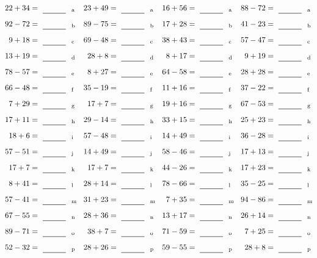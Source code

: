 \documentclass
[
  draft    = true,
  fontsize = 11pt,
  parskip  = half-
]
{scrartcl}
\begin{document}
\clearpage
\begin{align*}
    \pline{22+34}&=\rline{a}
  & \pline{23+49}&=\rline{a}
  & \pline{16+56}&=\rline{a}
  & \pline{88-72}&=\rline{a} \\[1ex]
    \pline{92-72}&=\rline{b}
  & \pline{89-75}&=\rline{b}
  & \pline{17+28}&=\rline{b}
  & \pline{41-23}&=\rline{b} \\[1ex]
    \pline{9+18}&=\rline{c}
  & \pline{69-48}&=\rline{c}
  & \pline{38+43}&=\rline{c}
  & \pline{57-47}&=\rline{c} \\[1ex]
    \pline{13+19}&=\rline{d}
  & \pline{28+8}&=\rline{d}
  & \pline{8+17}&=\rline{d}
  & \pline{9+19}&=\rline{d} \\[1ex]
    \pline{78-57}&=\rline{e}
  & \pline{8+27}&=\rline{e}
  & \pline{64-58}&=\rline{e}
  & \pline{28+28}&=\rline{e} \\[1ex]
    \pline{66-48}&=\rline{f}
  & \pline{35-19}&=\rline{f}
  & \pline{11+16}&=\rline{f}
  & \pline{37-22}&=\rline{f} \\[1ex]
    \pline{7+29}&=\rline{g}
  & \pline{17+7}&=\rline{g}
  & \pline{19+16}&=\rline{g}
  & \pline{67-53}&=\rline{g} \\[1ex]
    \pline{17+11}&=\rline{h}
  & \pline{29-14}&=\rline{h}
  & \pline{33+15}&=\rline{h}
  & \pline{25+23}&=\rline{h} \\[1ex]
    \pline{18+6}&=\rline{i}
  & \pline{57-48}&=\rline{i}
  & \pline{14+49}&=\rline{i}
  & \pline{36-28}&=\rline{i} \\[1ex]
    \pline{57-51}&=\rline{j}
  & \pline{14+49}&=\rline{j}
  & \pline{58-46}&=\rline{j}
  & \pline{17+13}&=\rline{j} \\[1ex]
    \pline{17+7}&=\rline{k}
  & \pline{17+7}&=\rline{k}
  & \pline{44-26}&=\rline{k}
  & \pline{17+23}&=\rline{k} \\[1ex]
    \pline{8+41}&=\rline{l}
  & \pline{28+14}&=\rline{l}
  & \pline{78-66}&=\rline{l}
  & \pline{35-25}&=\rline{l} \\[1ex]
    \pline{57-41}&=\rline{m}
  & \pline{31+23}&=\rline{m}
  & \pline{7+35}&=\rline{m}
  & \pline{94-86}&=\rline{m} \\[1ex]
    \pline{67-55}&=\rline{n}
  & \pline{28+36}&=\rline{n}
  & \pline{13+17}&=\rline{n}
  & \pline{26+14}&=\rline{n} \\[1ex]
    \pline{89-71}&=\rline{o}
  & \pline{38+7}&=\rline{o}
  & \pline{71-59}&=\rline{o}
  & \pline{7+25}&=\rline{o} \\[1ex]
    \pline{52-32}&=\rline{p}
  & \pline{28+26}&=\rline{p}
  & \pline{59-55}&=\rline{p}
  & \pline{28+8}&=\rline{p}
\end{align*}
\end{document}
